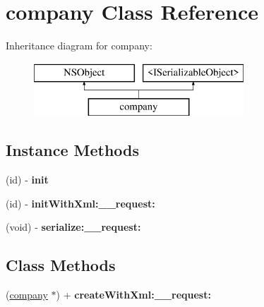 \hypertarget{interfacecompany}{}\section{company Class Reference}
\label{interfacecompany}
Inheritance diagram for company\+:\begin{figure}[H]
\begin{center}
\leavevmode
\includegraphics[height=2.000000cm]{interfacecompany}
\end{center}
\end{figure}
\subsection*{Instance Methods}
\begin{DoxyCompactItemize}
\item 
\hypertarget{interfacecompany_ac2b08c03f525de7184471fe58ba68413}{}(id) -\/ {\bfseries init}\label{interfacecompany_ac2b08c03f525de7184471fe58ba68413}

\item 
\hypertarget{interfacecompany_ada90f80d8ebf8e3cf98f30c4a559a0e5}{}(id) -\/ {\bfseries init\+With\+Xml\+:\+\_\+\+\_\+request\+:}\label{interfacecompany_ada90f80d8ebf8e3cf98f30c4a559a0e5}

\item 
\hypertarget{interfacecompany_accdc7f3bf2cd0616b3b6158a093a171d}{}(void) -\/ {\bfseries serialize\+:\+\_\+\+\_\+request\+:}\label{interfacecompany_accdc7f3bf2cd0616b3b6158a093a171d}

\end{DoxyCompactItemize}
\subsection*{Class Methods}
\begin{DoxyCompactItemize}
\item 
\hypertarget{interfacecompany_a2464d72aa4e7c64eea2f9cf2d268e509}{}(\hyperlink{interfacecompany}{company} $\ast$) + {\bfseries create\+With\+Xml\+:\+\_\+\+\_\+request\+:}\label{interfacecompany_a2464d72aa4e7c64eea2f9cf2d268e509}

\end{DoxyCompactItemize}
